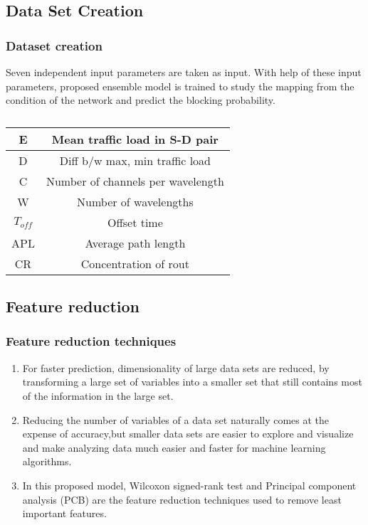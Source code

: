 \documentclass{beamer}
\begin{document}
\subsection*{Data Set Creation}
\begin{frame}[fragile]
\frametitle{Dataset creation}
\begin{block}{}
   Seven independent input parameters are taken as input. With help of these input parameters, proposed ensemble model is trained to study the mapping from the condition of the network and predict the blocking probability.
  \begin{table}[ht]
  \centering
  \begin{tabular}{|c|c|}
        \hline
         E & Mean traffic load in S-D pair\\
         \hline
         D & Diff b/w max, min traffic load\\ \hline
         C & Number of channels per wavelength \\
        \hline
         W & Number of wavelengths \\
        \hline
         \(T_{off}\) & Offset time\\
        \hline
        APL & Average path length\\
        \hline
        CR  & Concentration of rout \\ 
        \hline
    \end{tabular}
    \caption{}
\end{table}
\end{block}
 \end{frame}

\subsection*{Feature reduction}
\begin{frame}[fragile]
\frametitle{Feature reduction techniques}
\begin{block}{}
    \begin{enumerate}
     \item For faster prediction, dimensionality of large data sets are reduced, by transforming a large set of variables into a smaller set that still contains most of the information in the large set.
     \item Reducing the number of variables of a data set naturally comes at the expense of accuracy,but smaller data sets are easier to explore and visualize and make analyzing data much easier and faster for machine learning algorithms.
     \item In this proposed model, Wilcoxon signed-rank test and Principal component analysis (PCB) are the feature reduction techniques used to remove least important features.
\end{enumerate}
\end{block}
\end{frame}
\end{document}
